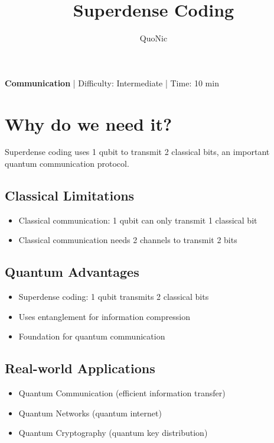 \documentclass[12pt,a4paper]{article}
\title{Superdense Coding}
\author{QuoNic}
\date{}
\begin{document}
\maketitle

\begin{center}
\textbf{Communication} | Difficulty: Intermediate | Time: 10 min
\end{center}

\tableofcontents
\newpage

\section{Why do we need it?}

Superdense coding uses 1 qubit to transmit 2 classical bits, an important quantum communication protocol.

\subsection{Classical Limitations}
\begin{itemize}
  \item Classical communication: 1 qubit can only transmit 1 classical bit
  \item Classical communication needs 2 channels to transmit 2 bits
\end{itemize}

\subsection{Quantum Advantages}
\begin{itemize}
  \item Superdense coding: 1 qubit transmits 2 classical bits
  \item Uses entanglement for information compression
  \item Foundation for quantum communication
\end{itemize}

\subsection{Real-world Applications}
\begin{itemize}
  \item Quantum Communication (efficient information transfer)
  \item Quantum Networks (quantum internet)
  \item Quantum Cryptography (quantum key distribution)
\end{itemize}
\end{document}
